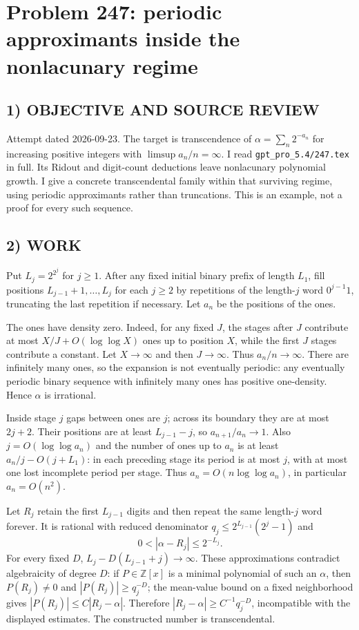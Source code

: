 \section{Problem 247: periodic approximants inside the nonlacunary regime}
\subsection*{1) OBJECTIVE AND SOURCE REVIEW}
Attempt dated 2026-09-23. The target is transcendence of $\alpha=\sum_n2^{-a_n}$ for increasing positive integers with $\limsup a_n/n=\infty$. I read \texttt{gpt\_pro\_5.4/247.tex} in full. Its Ridout and digit-count deductions leave nonlacunary polynomial growth. I give a concrete transcendental family within that surviving regime, using periodic approximants rather than truncations. This is an example, not a proof for every such sequence.
\subsection*{2) WORK}
Put $L_j=2^{2^j}$ for $j\ge1$. After any fixed initial binary prefix of length $L_1$, fill positions $L_{j-1}+1,\ldots,L_j$ for each $j\ge2$ by repetitions of the length-$j$ word $0^{j-1}1$, truncating the last repetition if necessary. Let $a_n$ be the positions of the ones.

The ones have density zero. Indeed, for any fixed $J$, the stages after $J$ contribute at most $X/J+O(\log\log X)$ ones up to position $X$, while the first $J$ stages contribute a constant. Let $X\to\infty$ and then $J\to\infty$. Thus $a_n/n\to\infty$. There are infinitely many ones, so the expansion is not eventually periodic: any eventually periodic binary sequence with infinitely many ones has positive one-density. Hence $\alpha$ is irrational.

Inside stage $j$ gaps between ones are $j$; across its boundary they are at most $2j+2$. Their positions are at least $L_{j-1}-j$, so $a_{n+1}/a_n\to1$. Also $j=O(\log\log a_n)$ and the number of ones up to $a_n$ is at least $a_n/j-O(j+L_1)$: in each preceding stage its period is at most $j$, with at most one lost incomplete period per stage. Thus $a_n=O(n\log\log a_n)$, in particular $a_n=O(n^2)$.

Let $R_j$ retain the first $L_{j-1}$ digits and then repeat the same length-$j$ word forever. It is rational with reduced denominator $q_j\le2^{L_{j-1}}(2^j-1)$ and
\[
0<|\alpha-R_j|\le2^{-L_j}.
\]
For every fixed $D$,
$L_j-D(L_{j-1}+j)\to\infty$. These approximations contradict algebraicity of degree $D$: if $P\in\mathbb Z[x]$ is a minimal polynomial of such an $\alpha$, then $P(R_j)\ne0$ and $|P(R_j)|\ge q_j^{-D}$; the mean-value bound on a fixed neighborhood gives $|P(R_j)|\le C|R_j-\alpha|$. Therefore $|R_j-\alpha|\ge C^{-1}q_j^{-D}$, incompatible with the displayed estimates. The constructed number is transcendental.
